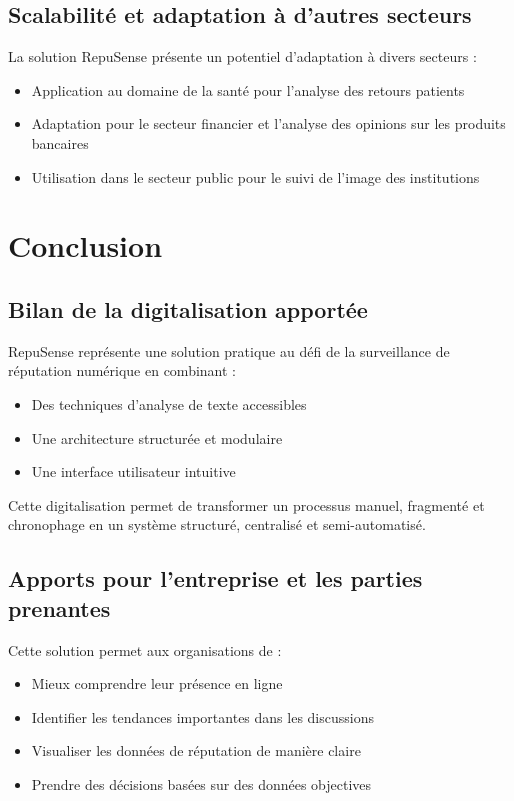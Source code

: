 \documentclass[12pt,a4paper]{report}
\begin{document}
\section{Scalabilité et adaptation à d'autres secteurs}
La solution RepuSense présente un potentiel d'adaptation à divers secteurs :
\begin{itemize}
    \item Application au domaine de la santé pour l'analyse des retours patients
    \item Adaptation pour le secteur financier et l'analyse des opinions sur les produits bancaires
    \item Utilisation dans le secteur public pour le suivi de l'image des institutions
\end{itemize}

\chapter{Conclusion}

\section{Bilan de la digitalisation apportée}
RepuSense représente une solution pratique au défi de la surveillance de réputation numérique en combinant :
\begin{itemize}
    \item Des techniques d'analyse de texte accessibles
    \item Une architecture structurée et modulaire
    \item Une interface utilisateur intuitive
\end{itemize}

Cette digitalisation permet de transformer un processus manuel, fragmenté et chronophage en un système structuré, centralisé et semi-automatisé.

\section{Apports pour l'entreprise et les parties prenantes}
Cette solution permet aux organisations de :
\begin{itemize}
    \item Mieux comprendre leur présence en ligne
    \item Identifier les tendances importantes dans les discussions
    \item Visualiser les données de réputation de manière claire
    \item Prendre des décisions basées sur des données objectives
\end{itemize}
\end{document}
